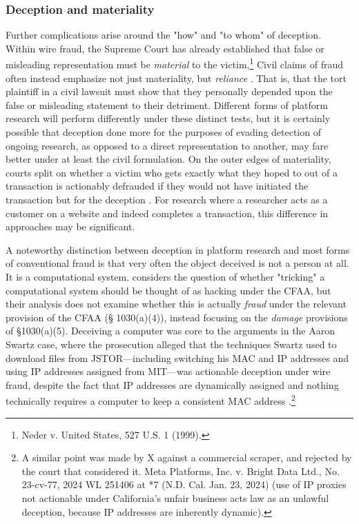 \subsubsection{Deception and materiality}
Further complications arise around the "how" and "to whom" of deception. Within wire fraud, the Supreme Court has already established that false or misleading representation must be \textit{material} to the victim,\footnote{Neder v. United States, 527 U.S. 1 (1999).} Civil claims of fraud often instead emphasize not just materiality, but \textit{reliance} \cite{goldberg_place_2006}. That is, that the tort plaintiff in a civil lawsuit must show that they personally depended upon the false or misleading statement to their detriment. Different forms of platform research will perform differently under these distinct tests, but it is certainly possible that deception done more for the purposes of evading detection of ongoing research, as opposed to a direct representation to another, may fare better under at least the civil formulation. On the outer edges of materiality, courts split on whether a victim who gets exactly what they hoped to out of a transaction is actionably defrauded if they would not have initiated the transaction but for the deception \cite{frohock2020}.  For research where a researcher acts as a customer on a website and indeed completes a transaction, this difference in approaches may be significant.

A noteworthy distinction between deception in platform research and most forms of conventional fraud is that very often the object deceived is not a person at all. It is a computational system. \cite{calo2018} considers the question of whether "tricking" a computational system should be thought of as hacking under the CFAA, but their analysis does not examine whether this is actually \textit{fraud} under the relevant provision of the CFAA (§ 1030(a)(4)), instead focusing on the \textit{damage} provisions of §1030(a)(5). Deceiving a computer was core to the arguments in the Aaron Swartz case, where the prosecution alleged that the techniques Swartz used to download files from JSTOR---including switching his MAC and IP addresses and using IP addresses assigned from MIT---was actionable deception under wire fraud, despite the fact that IP addresses are dynamically assigned and nothing technically requires a computer to keep a consistent MAC address \cite{sellars_impact_2013}.\footnote{A similar point was made by X against a commercial scraper, and rejected by the court that considered it. Meta Platforms, Inc. v. Bright Data Ltd., No. 23-cv-77, 2024 WL 251406 at *7 (N.D. Cal. Jan. 23, 2024) (use of IP proxies not actionable under California's unfair business acts law as an unlawful deception, because IP addresses are inherently dynamic).}

